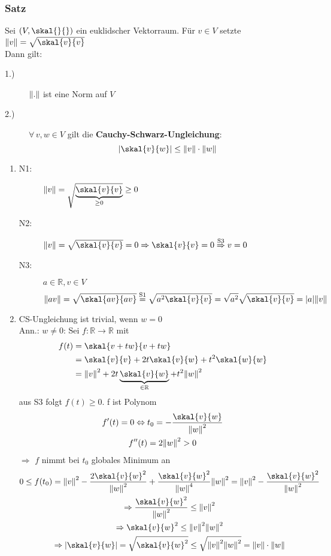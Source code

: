 \subsubsection{Satz} %
\label{ssub:satz}
Sei $(V,\skal{}{})$ ein euklidscher Vektorraum. Für $v \in V$ setzte $\norm{v}=\sqrt{\skal{v}{v}}$ \\ Dann gilt:
\begin{description}
	\item[1.)] $\norm{.}$ ist eine Norm auf $ V$ 
	\item[2.)] $\forall\, v,w \in V$ gilt die {\bfseries Cauchy-Schwarz-Ungleichung}:
	\[
		|\skal{v}{w}| \leq \norm{v} \cdot \norm{w}
	\]  
\end{description}
\begin{enumerate}
	\item \begin{description}
		\item[N1:] $\norm{v}=\sqrt{\underset{\geq 0}{\underbrace{\skal{v}{v}}}} \geq  0$
		\item[N2:] $\norm{v}=\sqrt{\skal{v}{v}}=0 \Rightarrow \skal{v}{v}=0 \stackrel{\text{S3}}{\Rightarrow} v=0$ 
		\item[N3:] $a \in \mathbb{R} , v \in V$ \[
			\norm{av}=\sqrt{\skal{av}{av}} \stackrel{\text{S1}}{=} \sqrt{a^2 \skal{v}{v}} = \sqrt{a^2} \sqrt{\skal{v}{v}} = \abs{a} \norm{v}
		\] 
	\end{description}
	\item CS-Ungleichung ist trivial, wenn $w=0$ \\
	Ann.: $w \neq 0$: Sei $f:\mathbb{R} \to \mathbb{R} $ mit
	\begin{align*}
		f(t) &=\skal{v+tw}{v+tw} \\
		& = \skal{v}{v} +2t \skal{v}{w} + t^2 \skal{w}{w} \\
		& = \norm{v}^2+ 2t \underbrace{\skal{v}{w}}_{\in \mathbb{R}} + t^2 \norm{w}^2 
	\end{align*} 
	aus S3 folgt $f(t)\geq 0$. f ist Polynom
	\begin{gather*}
		f'(t)=0 \Leftrightarrow t_0 = - \frac{\skal{v}{w}}{\norm{w}^2} \\
		f''(t)=2 \norm{w}^2 > 0
	\end{gather*}
 $\Rightarrow$ $f$ nimmt bei $t_0$ globales Minimum an
 \begin{gather*}
 	0 \leq f(t_0)=\norm{v}^2 - \frac{2 \skal{v}{w}^2}{\norm{w}^2} + \frac{\skal{v}{w}^2}{\norm{w}^4} \norm{w}^2 = \norm{v}^2 - \frac{\skal{v}{w}^2}{\norm{w}^2} \\
	\Rightarrow \frac{\skal{v}{w}^2}{\norm{w}^2} \leq \norm{v}^2 \\ \Rightarrow \skal{v}{w}^2 \leq \norm{v}^2 \norm{w}^2 \\
	\Rightarrow \abs{\skal{v}{w}} = \sqrt{\skal{v}{w}^2} \leq \sqrt{\norm{v}^2 \norm{w}^2} = \norm{v} \cdot \norm{w}
 \end{gather*}
 \bewende
\end{enumerate}
